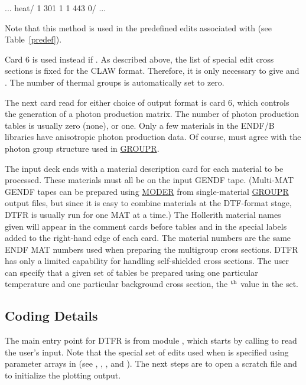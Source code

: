 \small
\begin{ccode}

       ...
       heat/
       1 301 1 1 443 0/
       ...

\end{ccode}
\normalsize

\noindent
Note that this method is used in the predefined edits associated with
 (see Table~\ref{predef}).

Card 6 is used instead if .  As described
above, the list of special edit cross sections is fixed for
the CLAW format.  Therefore, it is only necessary to give
 and .  The number of thermal groups
is automatically set to zero.

The next card read for either choice of output format is
card 6, which controls the generation of a photon production
matrix.  The number of photon production tables is usually
zero (none), or one.  Only a few materials in the ENDF/B
libraries have anisotropic photon production data.  Of course,
 must agree with the photon group structure used
in \hyperlink{sGROUPRhy}{GROUPR}.

The input deck ends with a material description card for
each material to be processed.  These materials must all be
on the input GENDF tape. (Multi-MAT GENDF tapes can be prepared
using \hyperlink{sMODERhy}{MODER} from single-material
\hyperlink{sGROUPRhy}{GROUPR} output files, but since
it is easy to combine materials at the DTF-format stage, DTFR
is usually run for one MAT at a time.) The Hollerith
material names given will appear in the comment cards before
tables and in the special labels added to the right-hand edge
of each card.  The material numbers  are the same ENDF
MAT numbers used when preparing the multigroup cross sections.
DTFR has only a limited capability for handling self-shielded
cross sections.  The user can specify that a given set of tables
be prepared using one particular temperature 
and one particular background cross section, the $^{\rm{th}}$
value in the set.

\subsection{Coding Details}
\label{ssDTFR_details}

The main entry point for DTFR is 
from module , which
starts by calling  to read the user's input.  Note that
the special set of edits used when  is specified
using parameter arrays in  (see ,
, , and ).  The next
steps are to open a scratch file  and to initialize
the plotting output.

